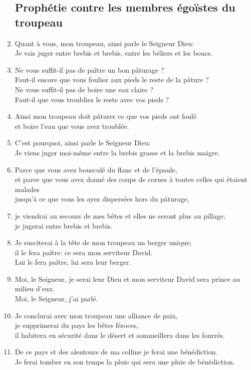 \begin{enumerate}[leftmargin=\psleftmargin, labelsep = \pslabelsep, label={\arabic*}, font=\color{\pscolor}\small\textsuperscript, parsep=0em, itemsep=0em, topsep=0em ]
\subsection*{Prophétie contre les membres égoïstes du troupeau}
 \item Quant à vous, mon troupeau, ainsi parle le Seigneur Dieu: \\ Je vais juger entre brebis et brebis, entre les béliers et les boucs.
\item Ne vous suffit-il pas de paître un bon pâturage ? \\ Faut-il encore que vous fouliez aux pieds le reste de la pâture ? \\ Ne vous suffit-il pas de boire une eau claire ? \\ Faut-il que vous troubliez le reste avec vos pieds ?
\item Ainsi mon troupeau doit pâturer ce que vos pieds ont foulé \\ et boire l’eau que vous avez troublée. \verseSpace
\item C’est pourquoi, ainsi parle le Seigneur Dieu: \\ Je viens juger moi-même entre la brebis grasse et la brebis maigre.
\item Parce que vous avez bousculé du flanc et de l’épaule, \\ et parce que vous avez donné des coups de cornes à toutes celles qui étaient malades \\ jusqu’à ce que vous les ayez dispersées hors du pâturage,
\item je viendrai au secours de mes bêtes et elles ne seront plus au pillage; \\ je jugerai entre brebis et brebis.
\item Je susciterai à la tête de mon troupeau un berger unique; \\ il le fera paître: ce sera mon serviteur David. \\ Lui le fera paître, lui sera leur berger.
\item Moi, le Seigneur, je serai leur Dieu et mon serviteur David sera prince au milieu d’eux. \\ Moi, le Seigneur, j’ai parlé.
\item Je conclurai avec mon troupeau une alliance de paix, \\ je supprimerai du pays les bêtes féroces, \\ il habitera en sécurité dans le désert et sommeillera dans les fourrés.
\item De ce pays et des alentours de ma colline je ferai une bénédiction. \\ Je ferai tomber en son temps la pluie qui sera une pluie de bénédiction.

\end{enumerate}
